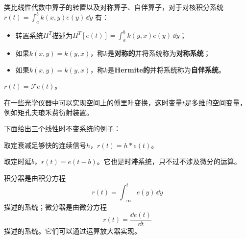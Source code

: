 \begin{definition}
    类比线性代数中算子的转置以及对称算子、自伴算子，对于对核积分系统
    $r(t)=\int_{a}^{b}k(x,y)e(y)\,\dd y$
    有：
    \begin{itemize}
        \item 转置系统$H^T$描述为$H^T[e(t)]=\int_{a}^{b}k(y,x)e(y)\,\dd y$；
        \item 如果$k(x,y)=k(y,x)$，称$k$是\textbf{对称的}并将系统称为\textbf{对称系统}；
        \item 如果$k(x,y)=\overline{k(y,x)}$，称$k$是\textbf{Hermite的}并将系统称为\textbf{自伴系统}。
    \end{itemize}
\end{definition}

\begin{example}[傅里叶变换]
    $r(t)=\mathcal{F} e(t)$。

    在一些光学仪器中可以实现空间上的傅里叶变换，这时变量$t$是多维的空间变量，例如矩孔夫琅禾费衍射装置。
\end{example}


下面给出三个线性时不变系统的例子：

\begin{example}[卷积]
    取定衰减足够快的连续信号$h$，$r(t)=h*e(t)$。
\end{example}

\begin{example}[信号平移]
    取定时延$b$，$r(t)=e(t-b)$。它也是时滞系统，只不过不涉及微分的运算。
\end{example}

\begin{example}[微分器与积分器]
    积分器是由积分方程
    \begin{equation}
        r(t)=\int_{-\infty}^{t}e(y)\,\dd y
    \end{equation}
    描述的系统；微分器是由微分方程
    \begin{equation}
        r(t)=\frac{\dd e(t)}{\dd t}
    \end{equation}
    描述的系统。它们可以通过运算放大器实现。
\end{example}

